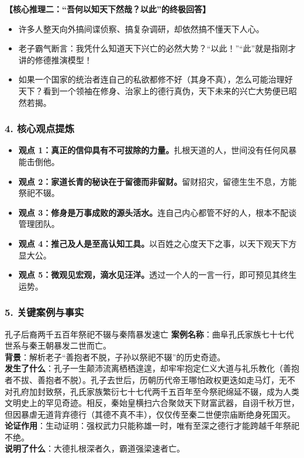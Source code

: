 \noindent\textbf{【核心推理二：“吾何以知天下然哉？以此”的终极回答】}
\begin{itemize}
    \item 许多人整天向外搞间谍侦察、搞复杂调研，却依然搞不懂天下人心。
    \item 老子霸气断言：我凭什么知道天下兴亡的必然大势？“以此！”“此”就是指刚才讲的修德推演模型！
    \item 如果一个国家的统治者连自己的私欲都修不好（其身不真），怎么可能治理好天下？看到一个领袖在修身、治家上的德行真伪，天下未来的兴亡大势便已昭然若揭。
\end{itemize}

\subsubsection{4. 核心观点提炼}
\begin{itemize}
    \item \textbf{观点 1：真正的信仰具有不可拔除的力量。}扎根天道的人，世间没有任何风暴能击倒他。
    \item \textbf{观点 2：家道长青的秘诀在于留德而非留财。}留财招灾，留德生生不息，方能祭祀不辍。
    \item \textbf{观点 3：修身是万事成败的源头活水。}连自己内心都管不好的人，根本不配谈管理团队。
    \item \textbf{观点 4：推己及人是至高认知工具。}以百姓之心度天下之事，以天下观天下方显大公。
    \item \textbf{观点 5：微观见宏观，滴水见汪洋。}透过一个人的一言一行，即可预见其终生运势。
\end{itemize}

\subsubsection{5. 关键案例与事实}
\begin{CaseBox}{孔子后裔两千五百年祭祀不辍与秦隋暴发速亡}
\textbf{案例名称}：曲阜孔氏家族七十七代世系与秦王朝暴发二世而亡。\\
\textbf{背景}：解析老子“善抱者不脱，子孙以祭祀不辍”的历史奇迹。\\
\textbf{发生了什么}：孔子一生颠沛流离栖栖遑遑，却牢牢抱定仁义大道与礼乐教化（善抱者不拔、善抱者不脱）。孔子去世后，历朝历代帝王哪怕政权更迭如走马灯，无不对孔府加封致祭，孔氏家族繁衍七十七代两千五百年至今祭祀绵延不辍，成为人类文明史上的罕见奇迹。相反，秦始皇横扫六合聚敛天下财富武器，自诩千秋万世，但因暴虐无道背弃德行（其德不真不丰），仅仅传至秦二世便宗庙断绝身死国灭。\\
\textbf{论证作用}：生动证明：强权武力只能称雄一时，唯有至深之德行才能跨越千年祭祀不绝。\\
\textbf{说明了什么}：大德扎根深者久，霸道强梁速者亡。
\end{CaseBox}

